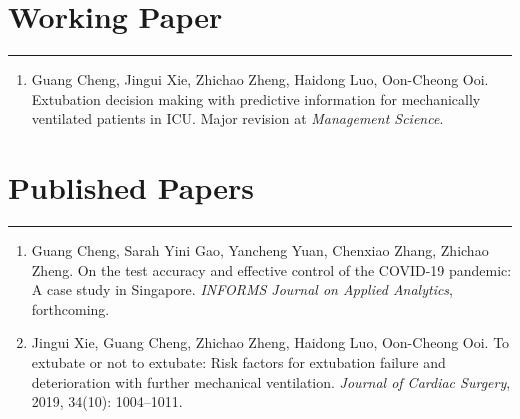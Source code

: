 \documentclass[12pt, a4paper]{article}
\begin{document}
{\begin{itemize}[leftmargin=36pt, itemsep=6pt, parsep=0.2pt, topsep=1pt]
\end{itemize}




\section*{Working Paper}
\vspace*{0.4em}
\hrule height 0.5pt
\begin{enumerate}[leftmargin=36pt, itemsep=6pt, parsep=0.2pt, topsep=1pt]

	\item Guang Cheng, Jingui Xie, Zhichao Zheng, Haidong Luo, Oon-Cheong Ooi.
	Extubation decision making with predictive information for mechanically ventilated patients in ICU.
	Major revision at {\it Management Science}.

\end{enumerate}




\section*{Published Papers}
\vspace*{0.4em}
\hrule height 0.5pt
\begin{enumerate}[leftmargin=36pt, itemsep=6pt, parsep=0.2pt, topsep=1pt]

	\item Guang Cheng, Sarah Yini Gao, Yancheng Yuan, Chenxiao Zhang, Zhichao Zheng. 
	On the test accuracy and effective control of the COVID-19 pandemic: A case study in Singapore. 
	{\it INFORMS Journal on Applied Analytics}, forthcoming.

	\item Jingui Xie, Guang Cheng, Zhichao Zheng, Haidong Luo, Oon-Cheong Ooi. 
	To extubate or not to extubate: Risk factors for extubation failure and deterioration with further mechanical ventilation. 
	{\it Journal of Cardiac Surgery}, 2019, 34(10): 1004–1011. 

\end{enumerate}



}
\end{document}
